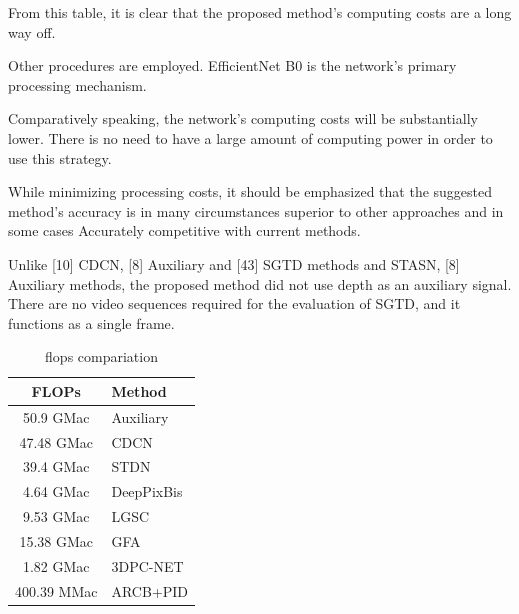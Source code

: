 \documentclass[journal]{IEEEtran}
\begin{document}
From this table, it is clear that the proposed method's computing costs are a long way off.

Other procedures are employed.
EfficientNet B0 is the network's primary processing mechanism.

Comparatively speaking, the network's computing costs will be substantially lower.
There is no need to have a large amount of computing power in order to use this strategy.

While minimizing processing costs, it should be emphasized that the suggested method's accuracy is in many circumstances superior to other approaches and in some cases Accurately competitive with current methods.

Unlike [10] CDCN, [8] Auxiliary and [43] SGTD methods and STASN, [8] Auxiliary methods, the proposed method did not use depth as an auxiliary signal.
There are no video sequences required for the evaluation of SGTD, and it functions as a single frame. 


\begin{table}[!h]
	\caption{flops compariation }
	\label{tab:flops}
	\centering
	\begin{tabular}{|c|l|}
		\hline FLOPs					& Method  \\
		\hline 50.9 GMac		 		& \cite{liu2018learning} Auxiliary   \\
		\hline 47.48 GMac 				&\cite{yu2020searching} CDCN \\
		\hline 39.4 GMac 				&\cite{liu2020disentangling} STDN \\
		\hline 4.64 GMac 				& \cite{george2019deep} DeepPixBis \\
		\hline 9.53 GMac 				&\cite{feng2020learning} LGSC        \\
		\hline 15.38 GMac 				&\cite{tu2020learning} GFA	\\
		\hline 1.82 GMac 				& \cite{li20203dpc}   3DPC-NET \\	
		\hline 400.39 MMac 				& ARCB+PID \\
		\hline
	\end{tabular}
\end{table}






 

\end{document}
